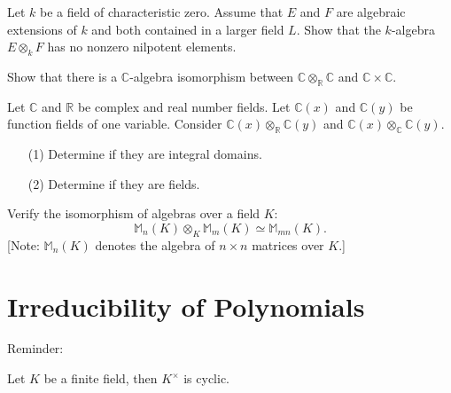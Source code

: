\begin{prob}[S2008-Q5]
    Let \(k\) be a field of characteristic zero. Assume that \(E\) and \(F\) are algebraic extensions of \(k\) and both contained in a larger field \(L\). Show that the \(k\)-algebra \(E \otimes_k F\) has no nonzero nilpotent elements.
\end{prob}


\begin{prob}[S2004-Q5]
    Show that there is a \(\mathbb{C}\)-algebra isomorphism between \(\mathbb{C} \otimes_{\mathbb{R}} \mathbb{C}\) and \(\mathbb{C} \times \mathbb{C}\).
\end{prob}


\begin{prob}[F2005-Q5]
    Let \(\mathbb{C}\) and \(\mathbb{R}\) be complex and real number fields. Let \(\mathbb{C}(x)\) and \(\mathbb{C}(y)\) be function fields of one variable. Consider \(\mathbb{C}(x) \otimes_{\mathbb{R}} \mathbb{C}(y)\) and \(\mathbb{C}(x) \otimes_{\mathbb{C}} \mathbb{C}(y)\).
    \begin{itemize}
        \item[(1)] Determine if they are integral domains.
        \item[(2)] Determine if they are fields.
    \end{itemize}
\end{prob}

\begin{prob}[F2003-Q4]
    Verify the isomorphism of algebras over a field \(K\):
    \[\mathbb{M}_n(K) \otimes_K \mathbb{M}_{m}(K) \simeq \mathbb{M}_{mn}(K).\]
    [Note: \(\mathbb{M}_n(K)\) denotes the algebra of \(n \times n\) matrices over \(K\).]
\end{prob}

















\chapter{Irreducibility of Polynomials}


Reminder: 
\begin{prop}
    Let $K$ be a finite field, then $K^\times$ is cyclic.
\end{prop}

